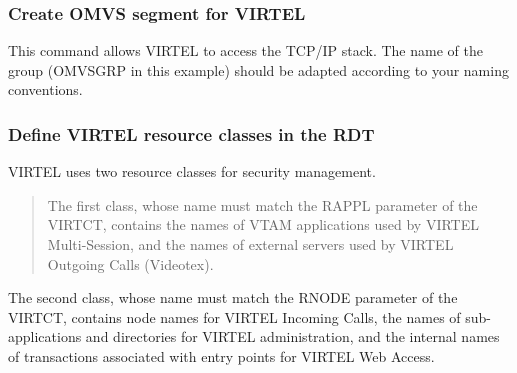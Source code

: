 \documentclass[letterpaper,10pt,english]{sphinxmanual}
\begin{document}
\subsubsection{Create OMVS segment for VIRTEL}
\label{\detokenize{Installation_Guide:id11}}
\begin{sphinxVerbatim}[commandchars=\\\{\}]
     
         
\end{sphinxVerbatim}


This command allows VIRTEL to access the TCP/IP stack. The name of the group (OMVSGRP in this example) should be adapted according to your naming conventions.


\subsubsection{Define VIRTEL resource classes in the RDT}
\label{\detokenize{Installation_Guide:define-virtel-resource-classes-in-the-rdt}}
\begin{sphinxVerbatim}[commandchars=\\\{\}]
  
  
\end{sphinxVerbatim}


VIRTEL uses two resource classes for security management.
\begin{quote}

The first class, whose name must match the RAPPL parameter of the VIRTCT, contains the names of VTAM applications used by VIRTEL Multi-Session, and the names of external servers used by VIRTEL Outgoing Calls (Videotex).
\end{quote}

The second class, whose name must match the RNODE parameter of the  VIRTCT, contains node names for VIRTEL Incoming Calls, the names of sub-applications and directories for VIRTEL administration, and the internal names of transactions associated with entry points for VIRTEL Web Access.
\end{document}

